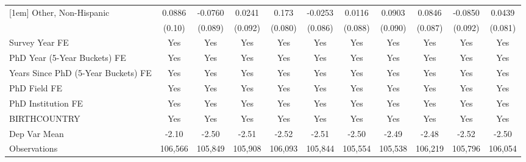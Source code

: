 \begin{table}[htbp]
\begin{tabular}{l*{10}{c}}
[1em]
Other, Non-Hispanic&      0.0886         &     -0.0760         &      0.0241         &       0.173\sym{**} &     -0.0253         &      0.0116         &      0.0903         &      0.0846         &     -0.0850         &      0.0439         \\
  &      (0.10)         &     (0.089)         &     (0.092)         &     (0.080)         &     (0.086)         &     (0.088)         &     (0.090)         &     (0.087)         &     (0.092)         &     (0.081)         \\
[1em]
Survey Year FE&         Yes         &         Yes         &         Yes         &         Yes         &         Yes         &         Yes         &         Yes         &         Yes         &         Yes         &         Yes         \\
[1em]
PhD Year (5-Year Buckets) FE&         Yes         &         Yes         &         Yes         &         Yes         &         Yes         &         Yes         &         Yes         &         Yes         &         Yes         &         Yes         \\
[1em]
Years Since PhD (5-Year Buckets) FE&         Yes         &         Yes         &         Yes         &         Yes         &         Yes         &         Yes         &         Yes         &         Yes         &         Yes         &         Yes         \\
[1em]
PhD Field FE&         Yes         &         Yes         &         Yes         &         Yes         &         Yes         &         Yes         &         Yes         &         Yes         &         Yes         &         Yes         \\
[1em]
PhD Institution FE&         Yes         &         Yes         &         Yes         &         Yes         &         Yes         &         Yes         &         Yes         &         Yes         &         Yes         &         Yes         \\
[1em]
BIRTHCOUNTRY&         Yes         &         Yes         &         Yes         &         Yes         &         Yes         &         Yes         &         Yes         &         Yes         &         Yes         &         Yes         \\
\hline
Dep Var Mean&       -2.10         &       -2.50         &       -2.51         &       -2.52         &       -2.51         &       -2.50         &       -2.49         &       -2.48         &       -2.52         &       -2.50         \\
Observations&     106,566         &     105,849         &     105,908         &     106,093         &     105,844         &     105,554         &     105,538         &     106,219         &     105,796         &     106,054         \\

\end{tabular}
\end{table}
